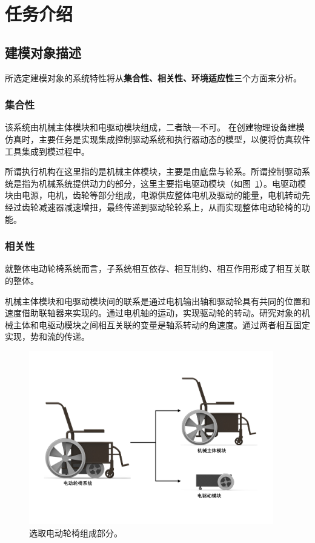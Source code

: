 \section{任务介绍}

\subsection{建模对象描述}

所选定建模对象的系统特性将从\textbf{集合性、相关性、环境适应性}三个方面来分析。

\subsubsection{集合性}

该系统由机械主体模块和电驱动模块组成，二者缺一不可。 在创建物理设备建模仿真时，主要任务是实现集成控制驱动系统和执行器动态的模型，以便将仿真软件工具集成到模过程中。 

所谓执行机构在这里指的是机械主体模块，主要是由底盘与轮系。所谓控制驱动系统是指为机械系统提供动力的部分，这里主要指电驱动模块（如图~\ref{fig:PW_parts}）。电驱动模块由电源，电机，齿轮等部分组成，电源供应整体电机及驱动的能量，电机转动先经过齿轮减速器减速增扭，最终传递到驱动轮轮系上，从而实现整体电动轮椅的功能。

\subsubsection{相关性}

就整体电动轮椅系统而言，子系统相互依存、相互制约、相互作用形成了相互关联的整体。

机械主体模块和电驱动模块间的联系是通过电机输出轴和驱动轮具有共同的位置和速度借助联轴器来实现的。通过电机轴的运动，实现驱动轮的转动。研究对象的机械主体和电驱动模块之间相互关联的变量是轴系转动的角速度。通过两者相互固定实现，势和流的传递。

\begin{figure}[!h]
	\centering
	\includegraphics[width=0.95\textwidth]{fig/PW_parts.pdf}
	\caption{选取电动轮椅组成部分。}\label{fig:PW_parts}
\end{figure}

